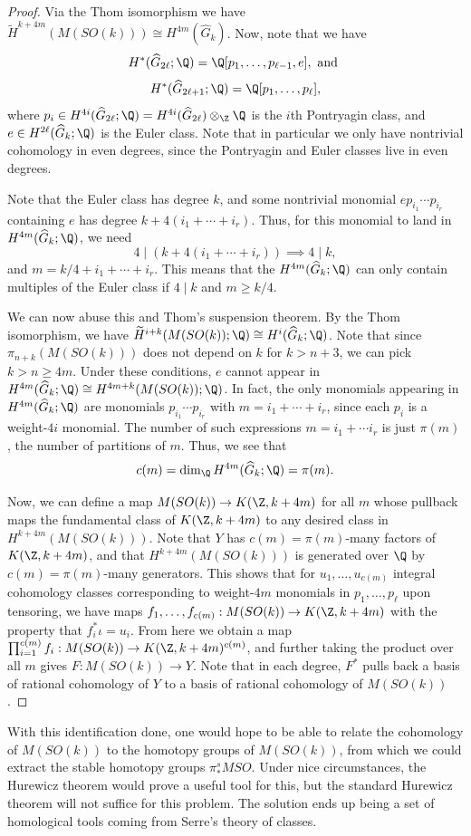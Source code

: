 \begin{proof}
    Via the Thom isomorphism we have $\widetilde H^{k+4m}(M(SO(k)))\cong H^{4m}(\widehat G_k)$.
    Now, note that we have 
    \[H^* (\widehat G_{2\ell};\Q)=\Q[p_1,\dots, p_{\ell-1},e],\text{ and }\]
    \[H^* (\widehat G_{2\ell+1};\Q)=\Q[p_1,\dots, p_{\ell}],\]
    where $p_i\in H^{4i}(\widehat G_{2\ell};\Q)=H^{4i}(\widehat G_{2\ell})\otimes_\Z \Q$ is the $i$th Pontryagin class, and $e\in H^{2\ell}(\widehat G_k;\Q)$ is the Euler class. Note that in particular we only have nontrivial cohomology in even degrees, since the Pontryagin and Euler classes live in even degrees. 
    
    Note that the Euler class has degree $k$, and some nontrivial monomial $ep_{i_1}\cdots p_{i_r}$ containing $e$ has degree $k+4(i_1+\cdots +i_r)$. Thus, for this monomial to land in $H^{4m}(\widehat G_k;\Q)$, we need 
    \[4\mid (k+4(i_1+\cdots +i_r))\implies 4\mid k,\]
    and $m=k/4+i_1+\cdots+i_r$. This means that the $H^{4m}(\widehat G_k;\Q)$ can only contain multiples of the Euler class if $4\mid k$ and $m\geq k/4$.

    We can now abuse this and Thom's suspension theorem. By the Thom isomorphism, we have $\widetilde H^{i+k}(M(SO(k));\Q)\cong H^i(\widehat G_k;\Q)$. Note that since $\pi_{n+k}(M(SO(k)))$ does not depend on $k$ for $k>n+3$, we can pick $k > n\geq 4m$. Under these conditions, $e$ cannot appear in $H^{4m}(\widehat G_k;\Q)\cong H^{4m+k}(M(SO(k));\Q)$. In fact, the only monomials appearing in $H^{4m}(\widehat G_k;\Q)$ are monomials $p_{i_1}\cdots p_{i_r}$ with $m=i_1+\cdots+i_r$, since each $p_i$ is a weight-$4i$ monomial. The number of such expressions $m=i_1+\cdots i_r$ is just $\pi(m)$, the number of partitions of $m$. Thus, we see that 
    \[c(m)=\dim_\Q H^{4m}(\widehat G_k;\Q)=\pi(m).\]

    Now, we can define a map $M(SO(k))\to K(\Z, k+4m)$ for all $m$ whose pullback maps the fundamental class of $K(\Z, k+4m)$ to any desired class in $H^{k+4m}(M(SO(k)))$. Note that $Y$ has $c(m)=\pi(m)$-many factors of $K(\Z, k+4m)$, and that $H^{k+4m}(M(SO(k)))$ is generated over $\Q$ by $c(m)=\pi(m)$-many generators. This shows that for $u_1,\dots, u_{c(m)}$ integral cohomology classes corresponding to weight-$4m$ monomials in $p_1,\dots, p_\ell$ upon tensoring, we have maps $f_1,\dots, f_{c(m)}:M(SO(k))\to K(\Z, k+4m)$ with the property that $f_i^*\iota=u_i$. From here we obtain a map $\prod_{i=1}^{c(m)} f_i:M(SO(k))\to K(\Z, k+4m)^{c(m)}$, and further taking the product over all $m$ gives $F:M(SO(k))\to Y$. Note that in each degree, $F^*$ pulls back a basis of rational cohomology of $Y$ to a basis of rational cohomology of $M(SO(k))$. 
\end{proof}
With this identification done, one would hope to be able to relate the cohomology of $M(SO(k))$ to the homotopy groups of $M(SO(k))$, from which we could extract the stable homotopy groups $\pi^s_*  MSO$. Under nice circumstances, the Hurewicz theorem would prove a useful tool for this, but the standard Hurewicz theorem will not suffice for this problem. The solution ends up being a set of homological tools coming from Serre's theory of classes.

